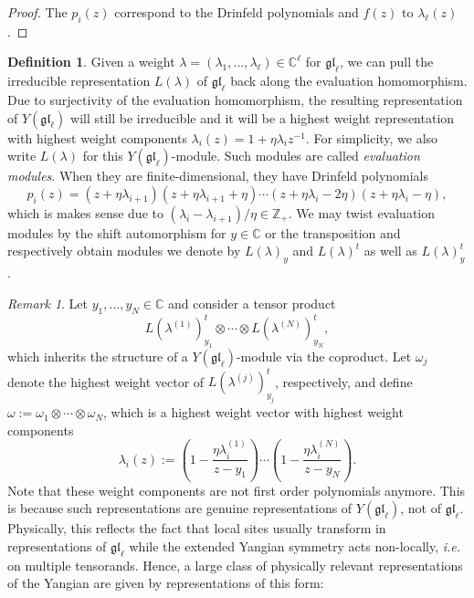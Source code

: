\documentclass[11pt]{report}
\theoremstyle{definition}
\newtheorem{definition}[theorem]{Definition}
\theoremstyle{remark}
\newtheorem*{remark}{Remark}
\theoremstyle{remark}
\newcommand{\Z}{\mathbb{Z}}
\newcommand{\C}{\mathbb{C}}
\begin{document}
\begin{proof}
The $p_i(z)$ correspond to the Drinfeld polynomials and $f(z)$ to $\lambda_\ell(z)$.
\end{proof}

\begin{definition}
Given a weight $\lambda = (\lambda_1,...,\lambda_\ell) \in \C^\ell$ for $\mathfrak{gl}_\ell$, we can pull the irreducible representation $L(\lambda)$ of $\mathfrak{gl}_\ell$ back along the evaluation homomorphism. Due to surjectivity of the evaluation homomorphism, the resulting representation of $Y(\mathfrak{gl}_\ell)$ will still be irreducible and it will be a highest weight representation with highest weight components $\lambda_i(z) = 1 + \eta \lambda_i z^{-1}$. For simplicity, we also write $L(\lambda)$ for this $Y(\mathfrak{gl}_\ell)$-module. Such modules are called \emph{evaluation modules}. When they are finite-dimensional, they have Drinfeld polynomials
\begin{equation*}
p_i(z) = (z+\eta \lambda_{i+1})(z+\eta \lambda_{i+1}+\eta) \cdots (z+\eta \lambda_i-2\eta)(z+\eta \lambda_i-\eta),
\end{equation*}
which is makes sense due to $(\lambda_i - \lambda_{i+1})/\eta \in \Z_+$. We may twist evaluation modules by the shift automorphism for $y \in \C$ or the transposition and respectively obtain modules we denote by $L(\lambda)_y$ and $L(\lambda)^t$ as well as $L(\lambda)_y^t$.
\end{definition}

\begin{remark}
Let $y_1,...,y_N \in \C$ and consider a tensor product
\begin{equation*}
L(\lambda^{(1)})_{y_1}^t \otimes \cdots \otimes L(\lambda^{(N)})_{y_N}^t,
\end{equation*}
which inherits the structure of a $Y(\mathfrak{gl}_\ell)$-module via the coproduct. Let $\omega_j$ denote the highest weight vector of $L(\lambda^{(j)})_{y_j}^t$, respectively, and define $\omega := \omega_1 \otimes \cdots \otimes \omega_N$, which is a highest weight vector with highest weight components
\begin{equation*}
\lambda_i(z) := \left( 1 - \frac{\eta \lambda_i^{(1)}}{z-y_1} \right) \cdots \left( 1 - \frac{\eta \lambda_i^{(N)}}{z-y_N} \right).
\end{equation*}
Note that these weight components are not first order polynomials anymore. This is because such representations are genuine representations of $Y(\mathfrak{gl}_\ell)$, not of $\mathfrak{gl}_\ell$. Physically, this reflects the fact that local sites usually transform in representations of $\mathfrak{gl}_\ell$ while the extended Yangian symmetry acts non-locally, \emph{i.e.} on multiple tensorands. Hence, a large class of physically relevant representations of the Yangian are given by representations of this form:
\end{remark}
\end{document}
